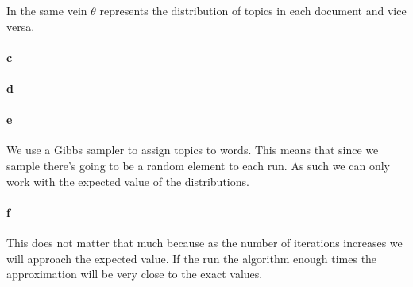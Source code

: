 \documentclass{article}
\begin{document}
In the same vein $\theta$ represents the distribution of topics in each
document and vice versa.

\paragraph{c}
\paragraph{d}
\paragraph{e}

We use a Gibbs sampler to assign topics to words. This means that since we
sample there's going to be a random element to each run. As such we can only
work with the expected value of the distributions.

\paragraph{f}

This does not matter that much because as the number of iterations increases we
will approach the expected value. If the run the algorithm enough times the
approximation will be very close to the exact values.
\end{document}
